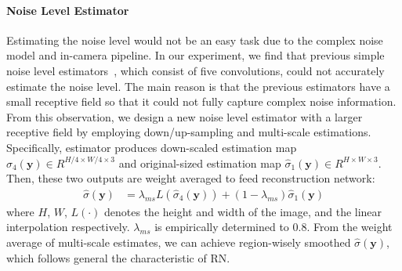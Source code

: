 \documentclass[10pt,twocolumn,letterpaper]{article}
\begin{document}
\paragraph{Noise Level Estimator}
Estimating the noise level would not be an easy task due to the complex noise model and in-camera pipeline.
In our experiment, we find that previous simple noise level estimators~\cite{guo2019toward,brooks2019unprocessing}, which consist of five convolutions, could not accurately estimate the noise level.
The main reason is that the previous estimators have a small receptive field so that it could not fully capture complex noise information.
From this observation, we design a new noise level estimator with a larger receptive field by employing down/up-sampling and multi-scale estimations.
Specifically, estimator produces down-scaled estimation map $\hat{\sigma}_{4}(\textbf{y}) \in \!R^{H/4 \times W/4 \times 3} $ and original-sized estimation map $\hat{\sigma}_1(\textbf{y}) \in \!R^{H \times W \times 3} $.
Then, these two outputs are weight averaged to feed reconstruction network:
\begin{align}
\hat{\sigma}(\textbf{y}) &= \lambda_{ms} L(\hat{\sigma}_4(\textbf{y})) + (1-\lambda_{ms}) \hat{\sigma}_1(\textbf{y})
\label{eq:1}
\end{align}
where $H$, $W$, $L(\cdot)$ denotes the height and width of the image, and the linear interpolation respectively.
$\lambda_{ms}$ is empirically determined to 0.8.
From the weight average of multi-scale estimates, we can achieve region-wisely smoothed $\hat{\sigma}(\textbf{y})$, 
which follows general the characteristic of RN.
\end{document}
